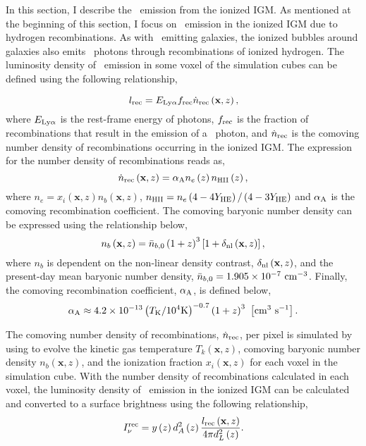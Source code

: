 \label{sec:ionized_igm}

In this section, I describe the \lya\ emission from the ionized IGM. As mentioned
at the beginning of this section, I focus on \lya\ emission in the ionized IGM due to hydrogen recombinations.
As with \lya\ emitting galaxies, the ionized bubbles around galaxies also emits \lya\ photons through
recombinations of ionized hydrogen. The luminosity density of \lya\ emission in
some voxel of the simulation cubes can be defined using the following relationship,

\begin{equation}
  l_{\rm rec} = E_{\rm Ly\alpha} f_{\rm rec} \dot{n}_{\rm rec} \left( \textbf{x}, z \right),
\end{equation}
where $E_{\rm Ly\alpha}$ is the rest-frame energy of \lya photons, $f_{\rm rec}$ is the
fraction of recombinations that result in the emission of a \lya\ photon, and $\dot{n}_{\rm rec}$
is the comoving number density of recombinations occurring in the ionized IGM. The expression for the
number density of recombinations reads as,
\begin{equation}
  \dot{n}_{\rm rec} \left( \textbf{x}, z \right) = \alpha_{\rm A} n_{e} \left(z \right) n_{\textsc{HII}} \left(z \right),
\end{equation}
where $n_{e} = x_i \left( \textbf{x}, z \right) n_{b} \left( \textbf{x}, z \right)$,
$n_{\textsc{HII}} = n_{e} \left(4 - 4 Y_{\rm HE} \right) /  \left(4 - 3 Y_{\rm HE} \right)$ and $\alpha_{\rm A}$
is the comoving recombination coefficient. The comoving baryonic number density can be expressed using the
relationship below,
\begin{equation}
  n_{b} \left( \textbf{x}, z \right) = \bar{n}_{b, 0} \left( 1 + z\right)^3 \left[1 + \delta_{\rm nl} \left( \textbf{x}, z\right) \right],
\end{equation}
where $n_{b}$ is dependent on the non-linear density contrast, $\delta_{\rm nl} \left( \textbf{x}, z\right)$, and the
present-day mean baryonic number density, $\bar{n}_{b, 0} = 1.905 \times 10^{-7} \ \rm{cm}^{-3}$. Finally, the
comoving recombination coefficient, $\alpha_{\rm A}$, is defined below,
\begin{equation}
  \alpha_{\rm A} \approx 4.2 \times 10^{-13} \left( T_{\rm K} / 10^4 {\rm K} \right)^{-0.7} \left( 1 + z\right)^3 \ \left[\rm  cm^3 \ s^{-1} \right].
\end{equation}

The comoving number density of recombinations, $\dot{n}_{\rm rec}$, per pixel is simulated
by using \fastsim to evolve the kinetic gas temperature $T_k \left( \textbf{x}, z \right)$,
comoving baryonic number density $n_{b} \left( \textbf{x}, z \right)$, and the ionization
fraction $x_{i} \left( \textbf{x}, z \right)$ for each voxel in the simulation cube.
With the number density of recombinations calculated in each voxel, the luminosity
density of \lya\ emission in the ionized IGM can be calculated and converted to
a surface brightness using the following relationship,
\begin{equation}
I_{\nu}^{\rm rec} = y \left(z \right) d_A^2 \left(z \right) \frac{l_{\rm rec} \left( \textbf{x}, z \right)}{4 \pi d_L^2 \left( z \right)}.
\end{equation}

